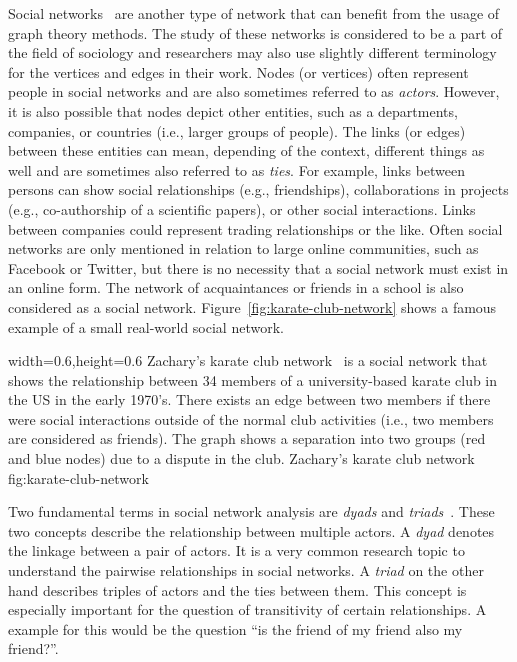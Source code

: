 Social networks~\cite{Newman2010} are another type of network that can benefit from the usage of graph theory methods.
The study of these networks is considered to be a part of the field of sociology and researchers may also use slightly different terminology for the vertices and edges in their work.
Nodes (or vertices) often represent people in social networks and are also sometimes referred to as \emph{actors}.
However, it is also possible that nodes depict other entities, such as a departments, companies, or countries (i.e., larger groups of people).
The links (or edges) between these entities can mean, depending of the context, different things as well and are sometimes also referred to as \emph{ties}.
For example, links between persons can show social relationships (e.g., friendships), collaborations in projects (e.g., co-authorship of a scientific papers), or other social interactions.
Links between companies could represent trading relationships or the like.
Often social networks are only mentioned in relation to large online communities, such as Facebook or Twitter, but there is no necessity that a social network must exist in an online form.
The network of acquaintances or friends in a school is also considered as a social network.
Figure~\ref{fig:karate-club-network} shows a famous example of a small real-world social network.

      {width=0.6\textwidth,height=0.6\textheight}
      {Zachary's karate club network~\cite{Zachary1977} is a social network that shows the relationship between 34 members of a university-based karate club in the US in the early 1970's.
      There exists an edge between two members if there were social interactions outside of the normal club activities (i.e., two members are considered as friends).
      The graph shows a separation into two groups (red and blue nodes) due to a dispute in the club.}
      {Zachary's karate club network}
      {fig:karate-club-network}

Two fundamental terms in social network analysis are \emph{dyads} and \emph{triads}~\cite{Wasserman1994}.
These two concepts describe the relationship between multiple actors.
A \emph{dyad} denotes the linkage between a pair of actors.
It is a very common research topic to understand the pairwise relationships in social networks.
A \emph{triad} on the other hand describes triples of actors and the ties between them.
This concept is especially important for the question of transitivity of certain relationships.
A example for this would be the question \enquote{is the friend of my friend also my friend?}.

